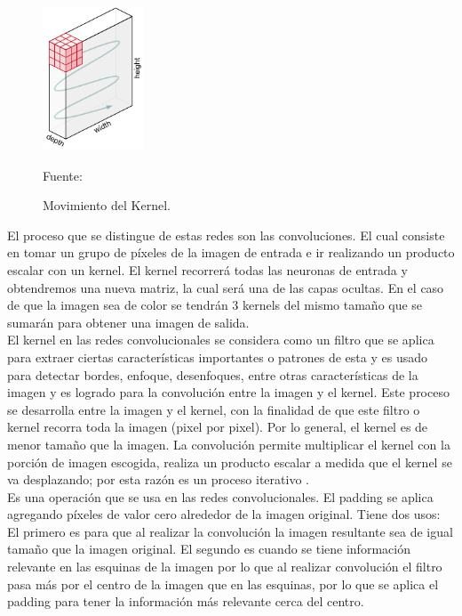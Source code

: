 \begin{figure}[H]
    \begin{center}
        \includegraphics[width=3cm]{img/capitulo_2/kernel.png}
        \caption{Movimiento del Kernel.\\}
        Fuente: \cite{comprension_redes_neuronales}
        \label{fig:kernel}
    \end{center}
    
\end{figure}

El proceso que se distingue de estas redes son las convoluciones. El cual consiste en tomar un grupo de píxeles de la imagen de entrada e ir realizando un producto escalar con un kernel. El kernel recorrerá todas las neuronas de entrada y obtendremos una nueva matriz, la cual será una de las capas ocultas. En el caso de que la imagen sea de color se tendrán 3 kernels del mismo tamaño que se sumarán para obtener una imagen de salida.\\

El kernel en las redes convolucionales se considera como un filtro que se aplica para extraer ciertas características importantes o patrones de esta y es usado para detectar bordes, enfoque, desenfoques, entre otras características de la imagen y es logrado para la convolución entre la imagen y el kernel. Este proceso se desarrolla entre la imagen y el kernel, con la finalidad de que este filtro o kernel recorra toda la imagen (pixel por pixel). Por lo general, el kernel es de menor tamaño que la imagen. La convolución permite multiplicar el kernel con la porción de imagen escogida, realiza un producto escalar a medida que el kernel se va desplazando; por esta razón es un proceso iterativo .\\

Es una operación que se usa en las redes convolucionales. El padding se aplica agregando píxeles de valor cero alrededor de la imagen original.
Tiene dos usos:
El primero es para que al realizar la convolución la imagen resultante sea de igual tamaño que la imagen original.
El segundo es cuando se tiene información relevante en las esquinas de la imagen por lo que al realizar convolución el filtro pasa más por el centro de la imagen que en las esquinas, por lo que se aplica el padding para tener la información más relevante cerca del centro.\\


